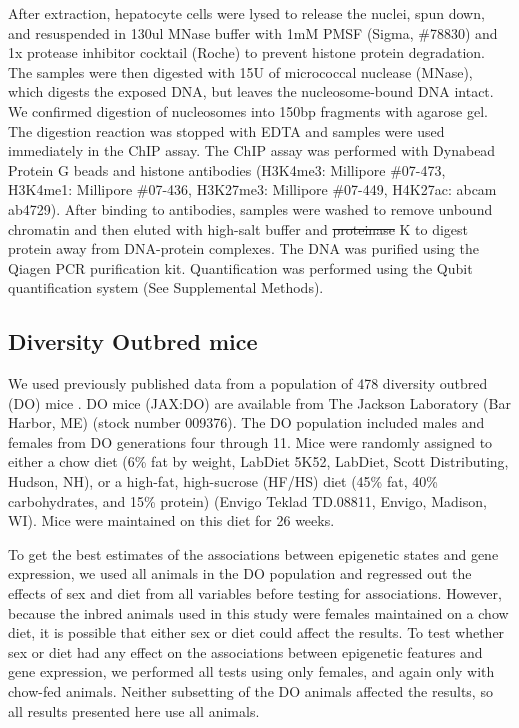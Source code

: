 \documentclass[
  11pt,
]{article}
\providecommand{\DIFaddtex}[1]{{\protect\color{blue}\uwave{#1}}} %
\providecommand{\DIFdeltex}[1]{{\protect\color{red}\sout{#1}}}                      %
\providecommand{\DIFaddbegin}{} %
\providecommand{\DIFaddend}{} %
\providecommand{\DIFdelbegin}{} %
\providecommand{\DIFdelend}{} %
\providecommand{\DIFadd}[1]{\texorpdfstring{\DIFaddtex{#1}}{#1}} %
\providecommand{\DIFdel}[1]{\texorpdfstring{\DIFdeltex{#1}}{}} %
\newcommand{\DIFscaledelfig}{0.5}
\newlength{\DIFdelgraphicswidth} %
\newlength{\DIFdelgraphicsheight} %
\newcommand{\DIFaddincludegraphics}[2][]{{\color{blue}\fbox{\DIFOincludegraphics[#1]{#2}}}} %
\newcommand{\DIFdelincludegraphics}[2][]{%
\sbox{\DIFdelgraphicsbox}{\DIFOincludegraphics[#1]{#2}}%
\settoboxwidth{\DIFdelgraphicswidth}{\DIFdelgraphicsbox} %
\settoboxtotalheight{\DIFdelgraphicsheight}{\DIFdelgraphicsbox} %
\scalebox{\DIFscaledelfig}{%
\parbox[b]{\DIFdelgraphicswidth}{\usebox{\DIFdelgraphicsbox}\\[-\baselineskip] \rule{\DIFdelgraphicswidth}{0em}}\llap{\resizebox{\DIFdelgraphicswidth}{\DIFdelgraphicsheight}{%
\setlength{\unitlength}{\DIFdelgraphicswidth}%
\begin{picture}(1,1)%
\thicklines\linethickness{2pt} %
{\color[rgb]{1,0,0}\put(0,0){\framebox(1,1){}}}%
{\color[rgb]{1,0,0}\put(0,0){\line( 1,1){1}}}%
{\color[rgb]{1,0,0}\put(0,1){\line(1,-1){1}}}%
\end{picture}%
}\hspace*{3pt}}} %
} %
\DeclareRobustCommand{\DIFaddbegin}{\DIFOaddbegin \let\includegraphics\DIFaddincludegraphics} %
\DeclareRobustCommand{\DIFaddend}{\DIFOaddend \let\includegraphics\DIFOincludegraphics} %
\DeclareRobustCommand{\DIFdelbegin}{\DIFOdelbegin \let\includegraphics\DIFdelincludegraphics} %
\DeclareRobustCommand{\DIFdelend}{\DIFOaddend \let\includegraphics\DIFOincludegraphics} %
\begin{document}
After extraction, hepatocyte cells were lysed to release the nuclei,
spun down, and resuspended in 130ul MNase buffer with 1mM PMSF (Sigma,
\#78830) and 1x protease inhibitor cocktail (Roche) to prevent histone
protein degradation. The samples were then digested with 15U of
micrococcal nuclease (MNase), which digests the exposed DNA, but leaves
the nucleosome-bound DNA intact. We confirmed digestion of nucleosomes
into 150bp fragments with agarose gel. The digestion reaction was
stopped with EDTA and samples were used immediately in the ChIP assay.
The ChIP assay was performed with Dynabead Protein G beads and histone
antibodies (H3K4me3: Millipore \#07-473, H3K4me1: Millipore \#07-436,
H3K27me3: Millipore \#07-449, H4K27ac: abcam ab4729). After binding to
antibodies, samples were washed to remove unbound chromatin and then
eluted with high-salt buffer and \DIFdelbegin \DIFdel{proteinase }\DIFdelend \DIFaddbegin \DIFadd{Proteinase }\DIFaddend K to digest protein away
from DNA-protein complexes. The DNA was purified using the Qiagen PCR
purification kit. Quantification was performed using the Qubit
quantification system (See Supplemental Methods).

\hypertarget{diversity-outbred-mice}{%
\subsection{Diversity Outbred mice}\label{diversity-outbred-mice}}

We used previously published data from a population of 478 diversity
outbred (DO) mice \citep{Svenson:2012hq}. DO mice (JAX:DO) are available
from The Jackson Laboratory (Bar Harbor, ME) (stock number 009376). The
DO population included males and females from DO generations four
through 11. Mice were randomly assigned to either a chow diet (6\% fat
by weight, LabDiet 5K52, LabDiet, Scott Distributing, Hudson, NH), or a
high-fat, high-sucrose (HF/HS) diet (45\% fat, 40\% carbohydrates, and
15\% protein) (Envigo Teklad TD.08811, Envigo, Madison, WI). Mice were
maintained on this diet for 26 weeks.

To get the best estimates of the associations between epigenetic states
and gene expression, we used all animals in the DO population and
regressed out the effects of sex and diet from all variables before
testing for associations. However, because the inbred animals used in
this study were females maintained on a chow diet, it is possible that
either sex or diet could affect the results. To test whether sex or diet
had any effect on the associations between epigenetic features and gene
expression, we performed all tests using only females, and again only
with chow-fed animals. Neither subsetting of the DO animals affected the
results, so all results presented here use all animals.
\end{document}
